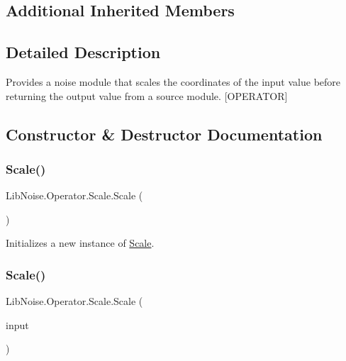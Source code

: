 \subsection*{Additional Inherited Members}


\subsection{Detailed Description}
Provides a noise module that scales the coordinates of the input value before returning the output value from a source module. \mbox{[}O\+P\+E\+R\+A\+T\+OR\mbox{]} 



\subsection{Constructor \& Destructor Documentation}
\mbox{\label{class_lib_noise_1_1_operator_1_1_scale_a4a3a90968f2500708c960c11b56d2589}} 
\subsubsection{\texorpdfstring{Scale()}{Scale()}\hspace{0.1cm}{\footnotesize\ttfamily [1/3]}}
{\footnotesize\ttfamily Lib\+Noise.\+Operator.\+Scale.\+Scale (\begin{DoxyParamCaption}{ }\end{DoxyParamCaption})}



Initializes a new instance of \hyperlink{class_lib_noise_1_1_operator_1_1_scale}{Scale}. 

\mbox{\label{class_lib_noise_1_1_operator_1_1_scale_a039595fc2470dbac9c391c8bf91e2b2c}} 
\subsubsection{\texorpdfstring{Scale()}{Scale()}\hspace{0.1cm}{\footnotesize\ttfamily [2/3]}}
{\footnotesize\ttfamily Lib\+Noise.\+Operator.\+Scale.\+Scale (\begin{DoxyParamCaption}\item[{\hyperlink{class_lib_noise_1_1_module_base}{Module\+Base}}]{input }\end{DoxyParamCaption})}



